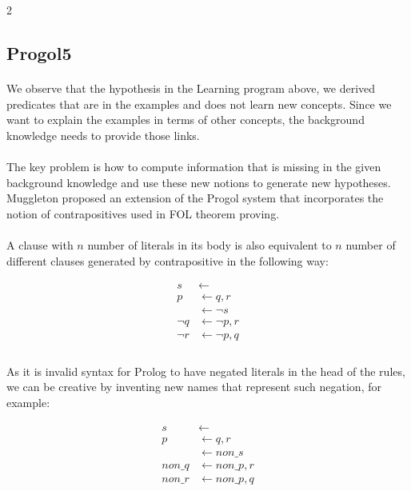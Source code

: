 \documentclass{article}
\theoremstyle{plain}
\theoremstyle{definition}
\begin{document}
\begin{multicols}{2}
\subsection{Progol5}

\paragraph{} We observe that the hypothesis in the Learning program above, we derived predicates that are in the examples and does not learn new concepts. Since we want to explain the examples in terms of other concepts, the background knowledge needs to provide those links.

\paragraph{} The key problem is how to compute information that is missing in the given background knowledge and use these new notions to generate new hypotheses. Muggleton proposed an extension of the Progol system that incorporates the notion of contrapositives used in FOL theorem proving\cite{muggleton00}.

\paragraph{} A clause with $n$ number of literals in its body is also equivalent to $n$ number of different clauses generated by contrapositive in the following way:

\begin{align*}
s &\leftarrow\\
p &\leftarrow q, r\\
&\leftarrow \lnot s\\
\lnot q &\leftarrow \lnot p, r\\
\lnot r &\leftarrow \lnot p, q\\
\end{align*}

\paragraph{} As it is invalid syntax for Prolog to have negated literals in the head of the rules, we can be creative by inventing new names that represent such negation, for example:

\begin{align*}
s &\leftarrow\\
p &\leftarrow q, r\\
&\leftarrow non\_s\\
non\_q &\leftarrow non\_p, r\\
non\_r &\leftarrow non\_p, q\\
\end{align*}


\end{multicols}
\end{document}

